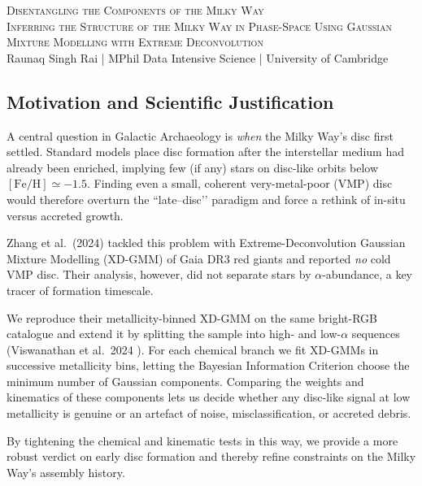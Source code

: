 \documentclass[a4paper,10pt]{article}
\begin{document}
\begin{center}
    {\Large \textsc{Disentangling the Components of the Milky Way}}\\[0.2cm]
    {\textsc{Inferring the Structure of the Milky Way in Phase-Space Using Gaussian Mixture Modelling with Extreme Deconvolution}}\\[0.2cm]
    Raunaq Singh Rai \quad | \quad MPhil Data Intensive Science \quad | \quad University of Cambridge
\end{center}

\begin{multicols}{2}

\subsection*{Motivation and Scientific Justification}

A central question in Galactic Archaeology is \emph{when} the Milky Way’s disc first settled.  
Standard models place disc formation after the interstellar medium had already been enriched, implying few (if any) stars on disc-like orbits below $[\mathrm{Fe/H}] \simeq -1.5$.  
Finding even a small, coherent very-metal-poor (VMP) disc would therefore overturn the “late–disc’’ paradigm and force a rethink of in-situ versus accreted growth.

Zhang et al.\ (2024) \cite{zhang2024existencemetalpoordiscmilky} tackled this problem with Extreme-Deconvolution Gaussian Mixture Modelling (XD-GMM) of Gaia DR3 red giants and reported \textit{no} cold VMP disc.  
Their analysis, however, did not separate stars by $\alpha$-abundance, a key tracer of formation timescale.

We reproduce their metallicity-binned XD-GMM on the same bright-RGB catalogue and extend it by splitting the sample into high- and low-$\alpha$ sequences (Viswanathan et al.\ 2024 \cite{Vis2024}).  
For each chemical branch we fit XD-GMMs in successive metallicity bins, letting the Bayesian Information Criterion choose the minimum number of Gaussian components.  
Comparing the weights and kinematics of these components lets us decide whether any disc-like signal at low metallicity is genuine or an artefact of noise, misclassification, or accreted debris.

By tightening the chemical and kinematic tests in this way, we provide a more robust verdict on early disc formation and thereby refine constraints on the Milky Way’s assembly history.


\end{multicols}
\end{document}
